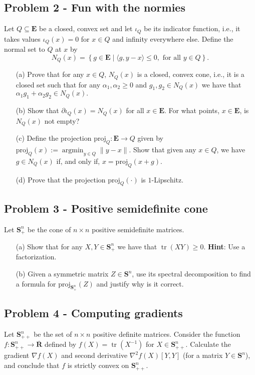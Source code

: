 \documentclass[11pt]{article}
\newcommand{\E}{\mathbf{E}}
\newcommand{\Spp}{\mathbf{S}_{++}^n}
\newcommand{\Sp}{\mathbf{S}_{+}^n}
\newcommand{\SSS}{\mathbf{S}^n}
\newcommand{\bR}{\overline{\mathbf{R}}}
\newcommand{\Tr}{\operatorname{tr}}
\begin{document}
\subsection*{Problem 2 - Fun with the normies}
\label{sec:org0f7249e}
Let \(Q \subseteq \E\) be a closed, convex set and let \(\iota_{Q}\) be its indicator function, i.e., it takes values \(\iota_{Q}(x) = 0\) for \(x \in Q\) and infinity everywhere else. Define the normal set to \(Q\) at \(x\) by
$$
N_{Q}(x) = \left\{g \in \E \mid \langle g, y - x\rangle \leq 0, \text{ for all } y \in Q\right\}.
$$
\begin{enumerate}
\item[(a)] Prove that for any $x\in Q$, $N_{Q}(x)$ is a closed, convex cone, i.e., it is a closed set such that for any $\alpha_{1}, \alpha_{2} \geq 0$ and $g_{1}, g_{2} \in N_{Q}(x)$ we have that $\alpha_{1} g_{1} + \alpha_{2} g_{2} \in N_{Q}(x).$
\item[(b)] Show that $\partial \iota_{Q}(x) = N_{Q}(x)$ for all $x \in \E$. For what points, $x \in \E$, is $N_{Q}(x)$ not empty?
\item[(c)] Define the projection $\textrm{proj}_{Q} \colon \E \rightarrow Q$ given by $\textrm{proj}_{Q}(x) := \operatorname{argmin}_{y \in Q} \|y - x\|$.  Show that given any $x \in Q$, we have $g \in N_{Q}(x)$ if, and only if, $x = \textrm{proj}_{Q}(x + g).$
\item[(d)] Prove that the projection $\textrm{proj}_{Q}(\cdot)$ is $1$-Lipschitz.
\end{enumerate}
\subsection*{Problem 3 - Positive semidefinite cone}
\label{sec:org2c1bf41}

Let \(\Sp\) be the cone of \(n \times n\) positive semidefinite matrices.

\begin{enumerate}
\item[(a)] Show that for any $X, Y \in \Sp$ we have that $\Tr(XY) \geq 0$. \textbf{Hint}: Use a factorization.
\item[(b)] Given a symmetric matrix $Z \in \SSS$, use its spectral decomposition to find a formula for $\text{proj}_{\Sp}(Z)$ and justify why is it correct.
\end{enumerate}
\subsection*{Problem 4 - Computing gradients}
\label{sec:org8ebf988}
Let \(\Spp\) be the set of \(n\times n\) positive definite matrices. Consider the function \(f \colon \Spp \rightarrow \bR\) defined by \(f(X) = \Tr(X^{-1})\) for \(X \in \Spp\). Calculate the gradient \(\nabla f(X)\) and second derivative \(\nabla^2 f(X)[Y, Y]\) (for a matrix \(Y \in \SSS\)), and conclude that \(f\) is strictly convex on \(\Spp\).
\end{document}

